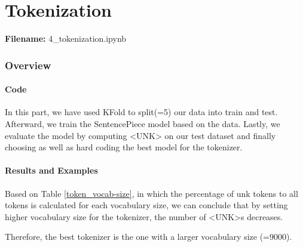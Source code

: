 \documentclass[12pt, a4paper]{article}
\begin{document}
	\newpage
	\part{Tokenization}
	\large{\textbf{Filename:} 4\_tokenization.ipynb}
	\section{Overview}
	
	\subsection{Code}
	In this part, we have used KFold to split(=5) our data into train and test. Afterward, we train the SentencePiece model based on the data. Lastly, we evaluate the model by computing <UNK> on our test dataset and finally choosing as well as hard coding the best model for the tokenizer. 
	
	\subsection{Results and Examples}
	Based on Table \ref{token_vocab-size}, in which the percentage of unk tokens to all tokens is calculated for each vocabulary size, we can conclude that by setting higher vocabulary size for the tokenizer, the number of <UNK>s decreases.
	
	Therefore, the best tokenizer is the one with a larger vocabulary size (=9000).
	
\end{document}
